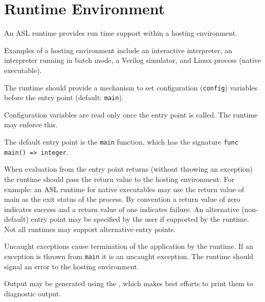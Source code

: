 \chapter{Runtime Environment\label{chap:RuntimeEnvironment}}

An ASL runtime provides run time support within a hosting environment.

Examples of a hosting environment include an interactive interpreter, an interpreter running in batch mode, a
Verilog simulator, and  Linux process (native executable).

The runtime should provide a mechanism to set configuration (\texttt{config})
variables before the entry point (default: \texttt{main}).

Configuration variables are read only once the entry point is called.
The runtime may enforce this.

The default entry point is the \texttt{main} function, which has the signature
\verb|func main() => integer|.

When evaluation from the entry point returns (without throwing an exception)
the runtime should pass the return value to the hosting environment.
%
For example: an ASL runtime for native executables may use the return value
of main as the exit status of the process.
%
By convention a return value of zero indicates success and a return value of
one indicates failure.
%
An alternative (non-default) entry point may be specified by the user if
supported by the runtime. Not all runtimes may support alternative entry points.

Uncaught exceptions cause termination of the application by the runtime.
If an exception is thrown from \texttt{main} it is
an uncaught exception. The runtime should signal an error to the hosting environment.

Output may be generated using the \printstatementterm, which makes
best efforts to print them to diagnostic output.
